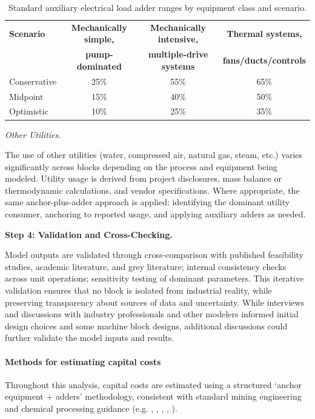 \begin{table}[h]
\caption{Standard auxiliary electrical load adder ranges by equipment class and scenario.}
\label{tab:c-elec-adders}
\begin{tabular}{lccc}
\hline
\textbf{Scenario} & \textbf{Mechanically simple,} & \textbf{Mechanically intensive,} & \textbf{Thermal systems,} \\
                  & \textbf{pump-dominated}       & \textbf{multiple-drive systems}  & \textbf{fans/ducts/controls} \\
\hline
Conservative & 25\% & 55\% & 65\% \\
Midpoint     & 15\% & 40\% & 50\% \\
Optimistic   & 10\% & 25\% & 35\% \\
\hline
\end{tabular}
\end{table}

\medskip
\noindent\textit{Other Utilities.}\quad

The use of other utilities (water, compressed air, natural gas, steam, etc.) varies significantly across blocks depending on the process and equipment being modeled. Utility usage is derived from project disclosures, mass balance or thermodynamic calculations, and vendor specifications. Where appropriate, the same anchor-plus-adder approach is applied: identifying the dominant utility consumer, anchoring to reported usage, and applying auxiliary adders as needed.

\medskip
\noindent\textbf{Step 4: Validation and Cross-Checking.}\quad

Model outputs are validated through cross-comparison with published feasibility studies, academic literature, and grey literature; internal consistency checks across unit operations; sensitivity testing of dominant parameters. This iterative validation ensures that no block is isolated from industrial reality, while preserving transparency about sources of data and uncertainty. While interviews and discussions with industry professionals and other modelers informed initial design choices and some machine block designs, additional discussions could further validate the model inputs and results.

\paragraph{Methods for estimating capital costs}

Throughout this analysis, capital costs are estimated using a structured `anchor equipment + adders' methodology, consistent with standard mining engineering and chemical processing guidance (e.g. \citet{petersPlantDesignEconomics1991}, \citet{ausimmMonograph27Cost}, \citet{turtonAnalysisSynthesisDesign2009}, \citet{ulrichGuideChemicalEngineering1984}, \citet{darlingSMEMiningEngineering2011}). 

